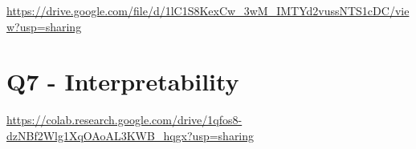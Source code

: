 \documentclass[a4paper]{article}    %
\begin{document}
\href{https://drive.google.com/file/d/1lC1S8KexCw_3wM_IMTYd2vussNTS1cDC/view?usp=sharing}{https://drive.google.com/file/d/1lC1S8KexCw\_3wM\_IMTYd2vussNTS1cDC/view?usp=sharing}

\section{Q7 - Interpretability}

\href{https://colab.research.google.com/drive/1qfos8-dzNBf2Wlg1XqOAoAL3KWB_hqgx?usp=sharing}{https://colab.research.google.com/drive/1qfos8-dzNBf2Wlg1XqOAoAL3KWB\_hqgx?usp=sharing}

\end{document}
